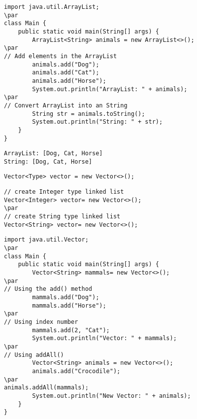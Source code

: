 \documentclass{book}
\def\lthtmlcheckvsize{\ifdim\ht\sizebox<\vsize 
  \ifdim\wd\sizebox<\hsize\expandafter\hfill\fi \expandafter\vfill
  \else\expandafter\vss\fi}%
\begin{document}
{\newpage\clearpage
{}%
\begin{lstlisting}
import java.util.ArrayList;
\par
class Main {
    public static void main(String[] args) {
        ArrayList<String> animals = new ArrayList<>();
\par
// Add elements in the ArrayList
        animals.add("Dog");
        animals.add("Cat");
        animals.add("Horse");
        System.out.println("ArrayList: " + animals);
\par
// Convert ArrayList into an String
        String str = animals.toString();
        System.out.println("String: " + str);
    }
}
\end{lstlisting}%
\lthtmlfigureZ
\lthtmlcheckvsize\clearpage}

{\newpage\clearpage
{}%
\begin{lstlisting}
ArrayList: [Dog, Cat, Horse]
String: [Dog, Cat, Horse]
\end{lstlisting}%
\lthtmlfigureZ
\lthtmlcheckvsize\clearpage}

{\newpage\clearpage
{}%
\begin{lstlisting}
Vector<Type> vector = new Vector<>();
\end{lstlisting}%
\lthtmlfigureZ
\lthtmlcheckvsize\clearpage}

{\newpage\clearpage
{}%
\begin{lstlisting}
// create Integer type linked list
Vector<Integer> vector= new Vector<>();
\par
// create String type linked list
Vector<String> vector= new Vector<>();
\end{lstlisting}%
\lthtmlfigureZ
\lthtmlcheckvsize\clearpage}

{\newpage\clearpage
{}%
\begin{lstlisting}
import java.util.Vector;
\par
class Main {
    public static void main(String[] args) {
        Vector<String> mammals= new Vector<>();
\par
// Using the add() method
        mammals.add("Dog");
        mammals.add("Horse");
\par
// Using index number
        mammals.add(2, "Cat");
        System.out.println("Vector: " + mammals);
\par
// Using addAll()
        Vector<String> animals = new Vector<>();
        animals.add("Crocodile");
\par
animals.addAll(mammals);
        System.out.println("New Vector: " + animals);
    }
}
\end{lstlisting}%
\lthtmlfigureZ
\lthtmlcheckvsize\clearpage}
\end{document}
